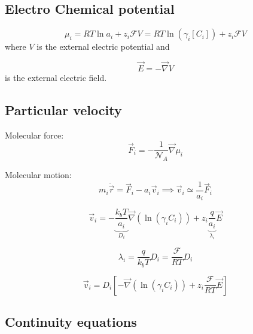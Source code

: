 \documentclass[aps,12pt]{revtex4}
\begin{document}
\subsection{Electro Chemical potential}

\begin{equation}
	\mu_i = RT \ln a_i + z_i \mathcal{F} V = RT \ln (\gamma_i[C_i]) + z_i \mathcal{F} V
\end{equation}
where $V$ is the external electric potential and

\begin{equation}
	\vec{E} = -\vec{\nabla} V
\end{equation}
is the external electric field.

\subsection{Particular velocity}
Molecular force:	
\begin{equation}
	\vec{F}_i = - \frac{1}{\mathcal{N}_A} \vec{\nabla} \mu_i
\end{equation}

Molecular motion:
\begin{equation}
	m_i \ddot {\vec{r}} = \vec{F}_i - a_i \vec{v}_i \implies \vec{v}_i \simeq \dfrac{1}{a_i} \vec{F}_i
\end{equation}

\begin{equation}
	\vec{v}_i = -\underbrace{\dfrac{k_bT}{a_i}}_{D_i} \vec{\nabla}(\ln(\gamma_i C_i))  + z_i \underbrace{\dfrac{ q}{a_i}}_{\lambda_i} \vec{E}
\end{equation}

\begin{equation}
	\lambda_i = \frac{q}{k_bT} D_i = \dfrac{\mathcal{F}}{RT} D_i
\end{equation}

\begin{equation}
\boxed{
	\vec{v}_i = D_i \left[ - \vec{\nabla}(\ln(\gamma_i C_i)) + z_i \dfrac{\mathcal{F}}{RT} \vec{E} \right]
}
\end{equation}

\subsection{Continuity equations}
\end{document}
